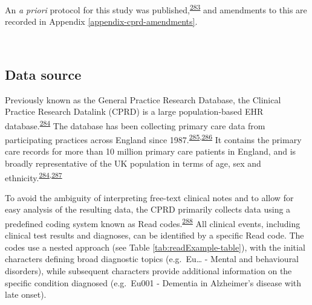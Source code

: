 \documentclass[a4paper, twoside]{templates/ociamthesis}
\begin{document}
An \emph{a priori} protocol for this study was published,\textsuperscript{\protect\hyperlink{ref-walker2016}{283}} and amendments to this are recorded in Appendix \ref{appendix-cprd-amendments}.

~

\hypertarget{cprd-data-source}{%
\subsection{Data source}\label{cprd-data-source}}

Previously known as the General Practice Research Database, the Clinical Practice Research Datalink (CPRD) is a large population-based EHR database.\textsuperscript{\protect\hyperlink{ref-herrett2015}{284}} The database has been collecting primary care data from participating practices across England since 1987.\textsuperscript{\protect\hyperlink{ref-williams2012}{285},\protect\hyperlink{ref-wood2001revitalizing}{286}} It contains the primary care records for more than 10 million primary care patients in England, and is broadly representative of the UK population in terms of age, sex and ethnicity.\textsuperscript{\protect\hyperlink{ref-herrett2015}{284},\protect\hyperlink{ref-mathur2014}{287}}

To avoid the ambiguity of interpreting free-text clinical notes and to allow for easy analysis of the resulting data, the CPRD primarily collects data using a predefined coding system known as Read codes.\textsuperscript{\protect\hyperlink{ref-booth1994}{288}} All clinical events, including clinical test results and diagnoses, can be identified by a specific Read code. The codes use a nested approach (see Table \ref{tab:readExample-table}), with the initial characters defining broad diagnostic topics (e.g.~Eu\ldots{} - Mental and behavioural disorders), while subsequent characters provide additional information on the specific condition diagnosed (e.g.~Eu001 - Dementia in Alzheimer's disease with late onset).

~
\end{document}

